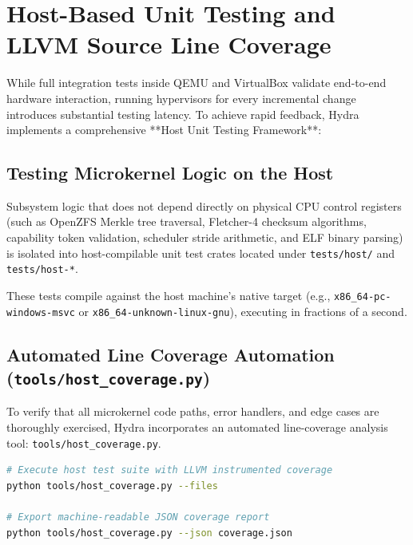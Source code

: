 \section{Host-Based Unit Testing and LLVM Source Line Coverage}
\label{sec:host_coverage_deep}

While full integration tests inside QEMU and VirtualBox validate end-to-end hardware interaction, running hypervisors for every incremental change introduces substantial testing latency. To achieve rapid feedback, Hydra implements a comprehensive **Host Unit Testing Framework**:

\subsection{Testing Microkernel Logic on the Host}
Subsystem logic that does not depend directly on physical CPU control registers (such as OpenZFS Merkle tree traversal, Fletcher-4 checksum algorithms, capability token validation, scheduler stride arithmetic, and ELF binary parsing) is isolated into host-compilable unit test crates located under \texttt{tests/host/} and \texttt{tests/host-*}.

These tests compile against the host machine's native target (e.g., \texttt{x86\_64-pc-windows-msvc} or \texttt{x86\_64-unknown-linux-gnu}), executing in fractions of a second.

\subsection{Automated Line Coverage Automation (\texttt{tools/host\_coverage.py})}
To verify that all microkernel code paths, error handlers, and edge cases are thoroughly exercised, Hydra incorporates an automated line-coverage analysis tool: \texttt{tools/host\_coverage.py}.

\begin{lstlisting}[language=bash, caption={Running Microkernel Line Coverage Analysis}]
# Execute host test suite with LLVM instrumented coverage
python tools/host_coverage.py --files

# Export machine-readable JSON coverage report
python tools/host_coverage.py --json coverage.json
\end{lstlisting}

